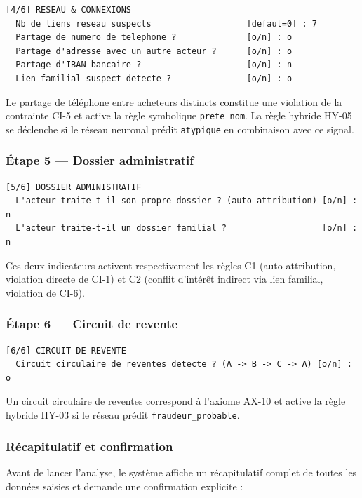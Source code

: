 \documentclass[11pt,a4paper]{report}
\begin{document}
\begin{lstlisting}
[4/6] RESEAU & CONNEXIONS
  Nb de liens reseau suspects                   [defaut=0] : 7
  Partage de numero de telephone ?              [o/n] : o
  Partage d'adresse avec un autre acteur ?      [o/n] : o
  Partage d'IBAN bancaire ?                     [o/n] : n
  Lien familial suspect detecte ?               [o/n] : o
\end{lstlisting}

Le partage de téléphone entre acheteurs distincts constitue une violation
de la contrainte CI-5 et active la règle symbolique \texttt{prete\_nom}.
La règle hybride HY-05 se déclenche si le réseau neuronal prédit
\texttt{atypique} en combinaison avec ce signal.

\subsubsection*{Étape 5 — Dossier administratif}

\begin{lstlisting}
[5/6] DOSSIER ADMINISTRATIF
  L'acteur traite-t-il son propre dossier ? (auto-attribution) [o/n] : n
  L'acteur traite-t-il un dossier familial ?                   [o/n] : n
\end{lstlisting}

Ces deux indicateurs activent respectivement les règles C1
(auto-attribution, violation directe de CI-1) et C2 (conflit d'intérêt
indirect via lien familial, violation de CI-6).

\subsubsection*{Étape 6 — Circuit de revente}

\begin{lstlisting}
[6/6] CIRCUIT DE REVENTE
  Circuit circulaire de reventes detecte ? (A -> B -> C -> A) [o/n] : o
\end{lstlisting}

Un circuit circulaire de reventes correspond à l'axiome AX-10 et active
la règle hybride HY-03 si le réseau prédit \texttt{fraudeur\_probable}.

\subsubsection*{Récapitulatif et confirmation}

Avant de lancer l'analyse, le système affiche un récapitulatif complet
de toutes les données saisies et demande une confirmation explicite :
\end{document}
